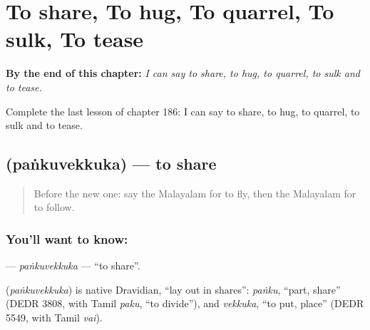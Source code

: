 
\chapter{To share, To hug, To quarrel, To sulk, To tease}
\label{ch:ml-to-share-to-hug-to-quarrel-to-sulk-to-tease}

\begin{chapteropening}
\textbf{By the end of this chapter:} \emph{I can say to share, to hug, to quarrel, to sulk and to tease.}

Complete the last lesson of chapter 186: I can say to share, to hug, to quarrel, to sulk and to tease.
\end{chapteropening}

\section[\texorpdfstring{\ml{പങ്കുവെക്കുക} (paṅkuvekkuka)}{പങ്കുവെക്കുക (paṅkuvekkuka)}]{ (paṅkuvekkuka) — to share}

\label{lesson:ML-C186-pankuvekkuka}



\begin{quote}
Before the new one: say the Malayalam for to fly, then the Malayalam for to follow.
\end{quote}

\subsection*{You'll want to know: }
\textbf{} — \emph{paṅkuvekkuka} — \textquotedblleft{}to share\textquotedblright{}.

\begin{cousinweb}
\textbf{} (\emph{paṅkuvekkuka}) is native Dravidian, \textquotedblleft{}lay out in shares\textquotedblright{}: \emph{paṅku}, \textquotedblleft{}part, share\textquotedblright{} (DEDR 3808, with Tamil \emph{paku}, \textquotedblleft{}to divide\textquotedblright{}), and \emph{vekkuka}, \textquotedblleft{}to put, place\textquotedblright{} (DEDR 5549, with Tamil \emph{vai}).
\end{cousinweb}

